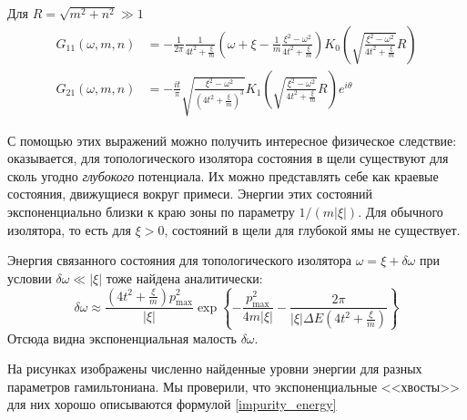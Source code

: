 Для $R = \sqrt{m^2 + n^2} \gg 1$ 
\begin{equation}
    \begin{split}
        G_{11}(\omega, m, n) & = -\frac{1}{2\pi} \frac{1}{4t^2 + \frac{\xi}{m}}
        \left( \omega + \xi - \frac{1}{m} \frac{\xi^2 - \omega^2}{4t^2 + \frac{\xi}{m}} \right)
        K_0 \left(\sqrt{\frac{\xi^2 - \omega^2}{4t^2 + \frac{\xi}{m}}}R \right)\\
        G_{21}(\omega, m, n) & = -\frac{it}{\pi} \sqrt{\frac{\xi^2 - \omega^2}
                                     {(4t^2 + \frac{\xi}{m})^{3}}}
        K_1 \left(\sqrt{\frac{\xi^2 - \omega^2}{4t^2 + \frac{\xi}{m}}}R \right)e^{i\theta}
    \end{split}
\end{equation}

С помощью этих выражений можно получить интересное физическое следствие: оказывается,
для топологического изолятора состояния в щели существуют для сколь угодно 
\emph{глубокого} потенциала. Их можно представлять себе как краевые состояния, 
движущиеся вокруг примеси. Энергии этих состояний экспоненциально близки
к краю зоны по параметру $1/(m|\xi|)$. 
Для обычного изолятора, то есть для $\xi > 0$, состояний в щели для глубокой ямы не существует.

Энергия связанного состояния для топологического изолятора
$\omega = \xi + \delta \omega$  при условии $\delta \omega \ll |\xi|$ тоже найдена
аналитически:
\begin{equation} 
    \label{impurity_energy}
    \delta \omega \approx \frac{\left(4t^2 + \frac{\xi}{m}\right)p_{\mathrm{max}}^2}{|\xi|}
            \exp\left\{ -\frac{p_{\mathrm{max}}^2}{4m|\xi|} - 
                        \frac{2\pi}{|\xi|\Delta E\left(4t^2 + \frac{\xi}{m}\right)}\right\}
\end{equation}
Отсюда видна экспоненциальная малость $\delta \omega$.

На рисунках изображены численно найденные уровни энергии для разных параметров гамильтониана.
Мы проверили, что экспоненциальные <<хвосты>> для них хорошо описываются формулой 
\eqref{impurity_energy}

